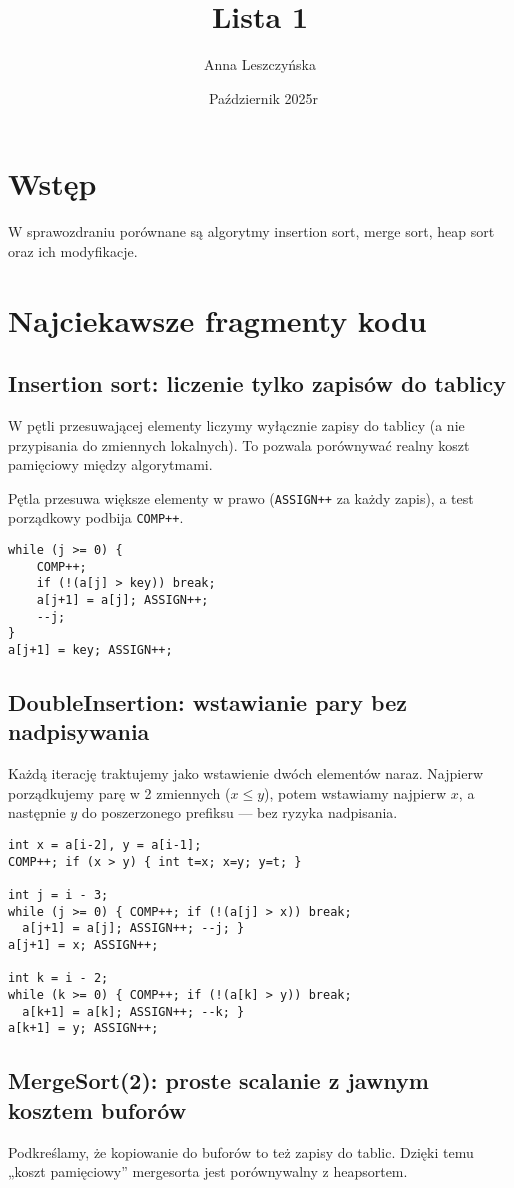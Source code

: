 \documentclass{article}
\title{Lista 1}
\author{Anna Leszczyńska}
\date{\ Październik 2025r }
\begin{document}
\maketitle
\section{Wstęp}
W sprawozdraniu porównane są algorytmy insertion sort, merge sort, heap sort oraz ich modyfikacje.
\section{Najciekawsze fragmenty kodu }

\subsection{Insertion sort: liczenie tylko zapisów do tablicy}
 W pętli przesuwającej elementy liczymy wyłącznie zapisy do tablicy (a nie przypisania do zmiennych lokalnych). To pozwala porównywać realny koszt pamięciowy między algorytmami.

 Pętla przesuwa większe elementy w prawo (\texttt{ASSIGN++} za każdy zapis), a test porządkowy podbija \texttt{COMP++}.
\begin{lstlisting}
while (j >= 0) {
    COMP++;                    
    if (!(a[j] > key)) break;
    a[j+1] = a[j]; ASSIGN++;   
    --j;
}
a[j+1] = key; ASSIGN++;
\end{lstlisting}

\subsection{DoubleInsertion: wstawianie pary bez nadpisywania}
 Każdą iterację traktujemy jako wstawienie  dwóch elementów naraz. Najpierw porządkujemy parę w 2 zmiennych (\(x\le y\)), potem wstawiamy najpierw \(x\), a następnie \(y\) do poszerzonego prefiksu — bez ryzyka nadpisania.

\begin{lstlisting}
int x = a[i-2], y = a[i-1];
COMP++; if (x > y) { int t=x; x=y; y=t; } 

int j = i - 3;
while (j >= 0) { COMP++; if (!(a[j] > x)) break;
  a[j+1] = a[j]; ASSIGN++; --j; }
a[j+1] = x; ASSIGN++;

int k = i - 2;
while (k >= 0) { COMP++; if (!(a[k] > y)) break;
  a[k+1] = a[k]; ASSIGN++; --k; }
a[k+1] = y; ASSIGN++;
\end{lstlisting}

\subsection{MergeSort(2): proste scalanie z jawnym kosztem buforów}
Podkreślamy, że kopiowanie do buforów to też zapisy do tablic. Dzięki temu „koszt pamięciowy” mergesorta jest porównywalny z heapsortem.
\end{document}
